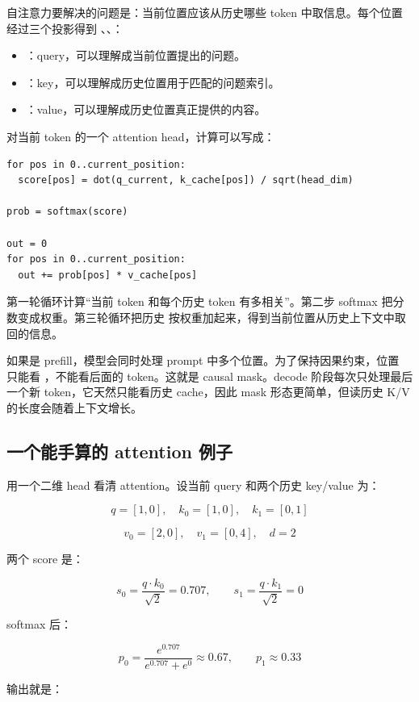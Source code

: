 自注意力要解决的问题是：当前位置应该从历史哪些 token 中取信息。每个位置经过三个投影得到 、、：

\begin{itemize}
  \item {}：query，可以理解成当前位置提出的问题。
  \item {}：key，可以理解成历史位置用于匹配的问题索引。
  \item {}：value，可以理解成历史位置真正提供的内容。
\end{itemize}

对当前 token 的一个 attention head，计算可以写成：

\begin{lstlisting}[numbers=none,caption={单 head decode attention}]
for pos in 0..current_position:
  score[pos] = dot(q_current, k_cache[pos]) / sqrt(head_dim)

prob = softmax(score)

out = 0
for pos in 0..current_position:
  out += prob[pos] * v_cache[pos]
\end{lstlisting}

第一轮循环计算“当前 token 和每个历史 token 有多相关”。第二步 softmax 把分数变成权重。第三轮循环把历史  按权重加起来，得到当前位置从历史上下文中取回的信息。

如果是 prefill，模型会同时处理 prompt 中多个位置。为了保持因果约束，位置  只能看 ，不能看后面的 token。这就是 causal mask。decode 阶段每次只处理最后一个新 token，它天然只能看历史 cache，因此 mask 形态更简单，但读历史 K/V 的长度会随着上下文增长。

\subsection{一个能手算的 attention 例子}

用一个二维 head 看清 attention。设当前 query 和两个历史 key/value 为：

\[
q=[1,0],\quad k_0=[1,0],\quad k_1=[0,1]
\]

\[
v_0=[2,0],\quad v_1=[0,4],\quad d=2
\]

两个 score 是：

\[
s_0=\frac{q\cdot k_0}{\sqrt{2}}=0.707,\qquad
s_1=\frac{q\cdot k_1}{\sqrt{2}}=0
\]

softmax 后：

\[
p_0=\frac{e^{0.707}}{e^{0.707}+e^0}\approx 0.67,\qquad
p_1\approx 0.33
\]

输出就是：

